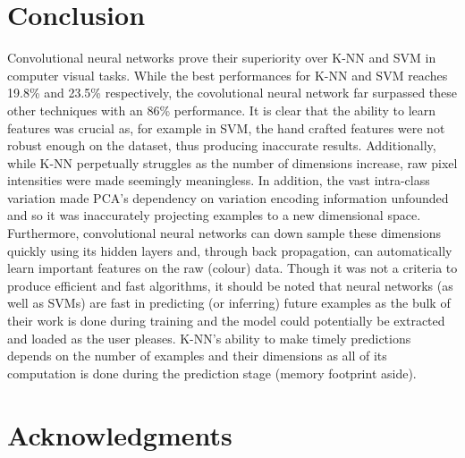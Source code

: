 \documentclass{article} %
\begin{document}
\section{Conclusion}
Convolutional neural networks prove their superiority over K-NN and SVM in computer visual tasks. While the best performances for K-NN and SVM reaches 19.8\% and 23.5\% respectively, the covolutional neural network far surpassed these other techniques with an 86\% performance. It is clear that the ability to learn features was crucial as, for example in SVM, the hand crafted features were not robust enough on the dataset, thus producing inaccurate results. Additionally, while K-NN perpetually struggles as the number of dimensions increase, raw pixel intensities were made seemingly meaningless. In addition, the vast intra-class variation made PCA's dependency on variation encoding information unfounded and so it was inaccurately projecting examples to a new dimensional space. Furthermore, convolutional neural networks can down sample these dimensions quickly using its hidden layers and, through back propagation, can automatically learn important features on the raw (colour) data. Though it was not a criteria to produce efficient and fast algorithms, it should be noted that neural networks (as well as SVMs) are fast in predicting (or inferring) future examples as the bulk of their work is done during training and the model could potentially be extracted and loaded as the user pleases. K-NN's ability to make timely predictions depends on the number of examples and their dimensions as all of its computation is done during the prediction stage (memory footprint aside).

\section*{Acknowledgments}

\small{
\nocite{*}


}
\end{document}
